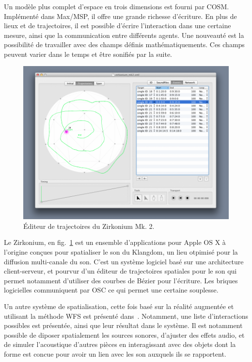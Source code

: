 \documentclass[french,12pt]{article}
\begin{document}
\cite{garcia_jeremie_processing_2015,garcia_towards_2015} %

Un modèle plus complet d'espace en trois dimensions est fourni par COSM\cite{wakefield_cosm:_2011}.
Implémenté dans Max/MSP, il offre une grande richesse d'écriture.
En plus de lieux et de trajectoires, il est possible d'écrire l'interaction dans une certaine mesure, 
ainsi que la communication entre différents agents.
Une nouveauté est la possibilité de travailler avec des champs définis mathématiquements. 
Ces champs peuvent varier dans le temps et être sonifiés par la suite.

\begin{figure}[h]
    \centering
    \includegraphics[scale=0.35]{images/zirkonium.png}
    \caption{Éditeur de trajectoires du Zirkonium Mk. 2.}
    \label{fig.zirkonium}
\end{figure}

Le Zirkonium, en fig.~\ref{fig.zirkonium} est un ensemble d'applications pour Apple OS X à l'origine conçues pour spatialiser le son du Klangdom, un lieu otpimisé pour la diffusion multi-canale du son. C'est un système logiciel basé sur une architecture client-serveur, et pourvur d'un éditeur de trajectoires spatiales pour le son qui permet notamment d'utiliser des courbes de Bézier pour l'écriture\cite{wagner_introducing_2014}. Les briques logicielles communiquent par OSC ce qui permet une certaine souplesse.

Un autre système de spatialisation, cette fois basé sur la réalité augmentée et utilisant la méthode \ac{WFS} est présenté dans~\cite{melchior_authoring_2005}. Notamment, une liste d'interactions possibles est présentée, ainsi que leur résultat dans le système. Il est notamment possible de diposer spatialement les sources sonores, d'ajuster des effets audio, et de simuler l'acoustique d'autres pièces en interagissant avec des objets dont la forme est concue pour avoir un lien avec les son auxquels ils se rapportent.
\end{document}

